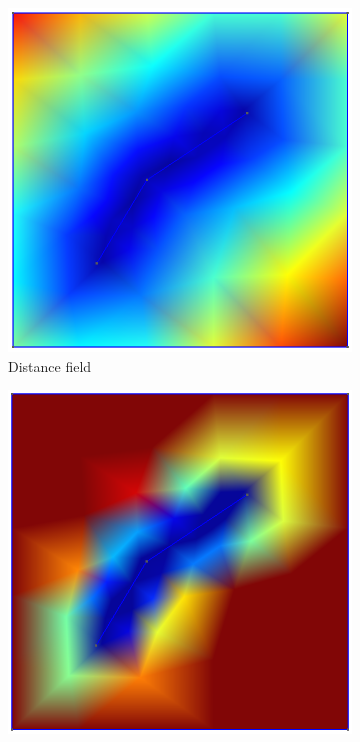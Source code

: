 \begin{figure}
    \centering
    \begin{subfigure}[b]{0.45\textwidth}
        \centering
        \includegraphics[width=\textwidth]{report/Images/Software/Gmsh fields/gmsh_field_distance.png}
        \caption{Distance field}
        \label{fig:gmsh-distance}
    \end{subfigure}
    \begin{subfigure}[b]{0.45\textwidth}
        \centering
        \includegraphics[width=\textwidth]{report/Images/Software/Gmsh fields/gmsh_field_threshold.png}

\end{subfigure}
\end{figure}
